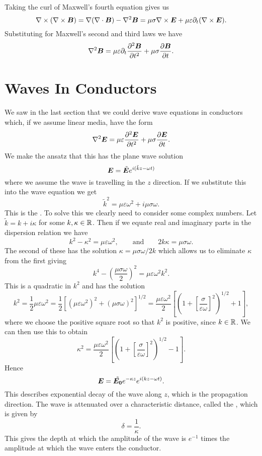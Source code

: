     Taking the curl of Maxwell's fourth equation gives us
    \[\nabla\times(\nabla\times\bm{B}) = \nabla(\nabla\cdot\bm{B}) - \nabla^2\bm{B} = \mu\sigma\nabla\times\bm{E} + \mu\varepsilon\partial_t(\nabla\times\bm{E}).\]
    Substituting for Maxwell's second and third laws we have
    \[\nabla^2\bm{B} =  \mu\varepsilon\partial_t\pdv[2]{\bm{B}}{t} + \mu\sigma\pdv{\bm{B}}{t}.\]
    
    \section{Waves In Conductors}
    We saw in the last section that we could derive wave equations in conductors which, if we assume linear media, have the form
    \[\nabla^2\bm{E} = \mu\varepsilon\pdv[2]{\bm{E}}{t} + \mu\sigma\pdv{\bm{E}}{t}.\]
    We make the ansatz that this has the plane wave solution
    \[\bm{E} = \tilde{\bm{E}}e^{i(\tilde{k}z - \omega t)}\]
    where we assume the wave is travelling in the \(z\) direction.
    If we substitute this into the wave equation we get
    \[\tilde{k}^2 = \mu\varepsilon\omega^2 + i\mu\sigma\omega.\]
    This is the .
    To solve this we clearly need to consider some complex numbers.
    Let \(\tilde{k} = k + i\kappa\) for some \(k, \kappa\in\mathbb{R}\).
    Then if we equate real and imaginary parts in the dispersion relation we have
    \[k^2 - \kappa^2 = \mu\varepsilon\omega^2, \qquad\text{and}\qquad 2k\kappa = \mu\sigma\omega.\]
    The second of these has the solution \(\kappa = \mu\sigma\omega/2k\) which allows us to eliminate \(\kappa\) from the first giving
    \[k^4 - \left(\frac{\mu\sigma\omega}{2}\right)^2 = \mu\varepsilon\omega^2k^2.\]
    This is a quadratic in \(k^2\) and has the solution
    \[k^2 = \frac{1}{2}\mu\varepsilon\omega^2 = \frac{1}{2}\left[(\mu\varepsilon\omega^2)^2 + (\mu\sigma\omega)^2\right]^{1/2} = \frac{\mu\varepsilon\omega^2}{2}\left[\left(1 + \left[\frac{\sigma}{\varepsilon\omega}\right]^2\right)^{1/2} + 1\right],\]
    where we choose the positive square root so that \(k^2\) is positive, since \(k\in\mathbb{R}\).
    We can then use this to obtain
    \[\kappa^2 = \frac{\mu\varepsilon\omega^2}{2}\left[\left(1 + \left[\frac{\sigma}{\varepsilon\omega}\right]^2\right)^{1/2} - 1\right].\]
    Hence
    \[\bm{E} = \tilde{\bm{E_0}}e^{-\kappa z}e^{i(kz - \omega t)}.\]
    This describes exponential decay of the wave along \(z\), which is the propagation direction.
    The wave is attenuated over a characteristic distance, called the , which is given by
    \[\delta = \frac{1}{\kappa}.\]
    This gives the depth at which the amplitude of the wave is \(e^{-1}\) times the amplitude at which the wave enters the conductor.
    
